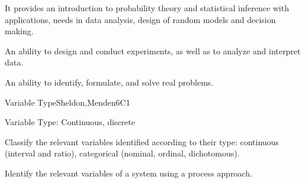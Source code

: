 
\begin{syllabus}


\begin{justification}
It provides an introduction to probability theory and statistical inference with applications, needs in data analysis, design of random models and decision making.
\end{justification}

\begin{goals}
\item An ability to design and conduct experiments, as well as to analyze and interpret data.
\item An ability to identify, formulate, and solve real problems.
\end{goals}

\begin{outcomes}
   \item {}
   \item {}
\end{outcomes}

\begin{competences}
    \item {} 
    \item {}
\end{competences}


\begin{unit}{Variable Type}{}{Sheldon,Menden}{6}{C1}
\begin{topics}
      \item Variable Type: Continuous, discrete
   \end{topics}

   \begin{learningoutcomes}
      \item Classify the relevant variables identified according to their type: continuous (interval and ratio), categorical (nominal, ordinal, dichotomous).
      \item Identify the relevant variables of a system using a process approach.
   \end{learningoutcomes}
\end{unit}


\end{syllabus}
